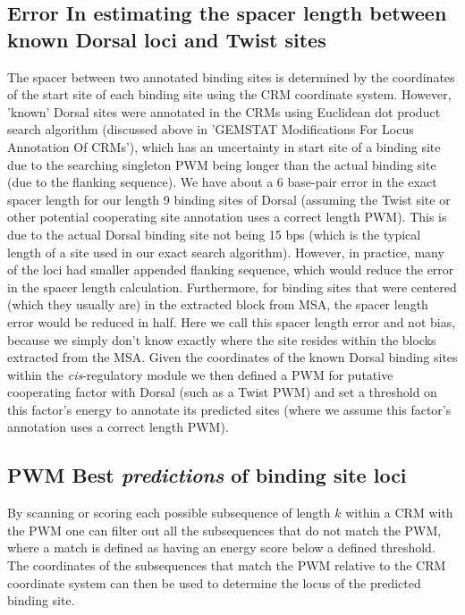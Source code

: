 	   \subsection{Error In estimating the spacer length between known Dorsal loci and Twist sites}
	The spacer between two annotated binding sites is determined by the coordinates of the start site of each binding site using the CRM coordinate system.  However, 'known' Dorsal sites were annotated in the CRMs using Euclidean dot product search algorithm (discussed above in 'GEMSTAT Modifications For Locus Annotation Of CRMs'), which has an uncertainty in start site of a binding site due to the searching singleton PWM being longer than the actual binding site (due to the flanking sequence).  
	We have about a 6 base-pair error in the exact spacer length for our length 9 binding sites of Dorsal (assuming the Twist site or other potential cooperating site annotation uses a correct length PWM).  This is due to the actual Dorsal binding site not being 15 bps (which is the typical length of a site used in our exact search algorithm).  However, in practice, many of the loci had smaller appended flanking sequence, which would reduce the error in the spacer length calculation.  Furthermore, for binding sites that were centered (which they usually are) in the extracted block from MSA, the spacer length error would be reduced in half.  Here we call this spacer length error and not bias, because we simply don't know exactly where the site resides within the blocks extracted from the MSA.  
	Given the coordinates of the known Dorsal binding sites within the \textit{cis}-regulatory module we then defined a PWM for putative cooperating factor with Dorsal (such as a Twist PWM) and set a threshold on this factor's energy to annotate its predicted sites (where we assume this factor's annotation uses a correct length PWM).
	
	\subsection{PWM Best \textit{predictions} of binding site loci }  
By scanning or scoring each possible subsequence of length $k$ within a CRM with the PWM one can filter out all the subsequences that do not match the PWM, where a match is defined as having an energy score below a defined threshold.  The coordinates of the subsequences that match the PWM relative to the CRM coordinate system can then be used to determine the locus of the predicted binding site.
	

